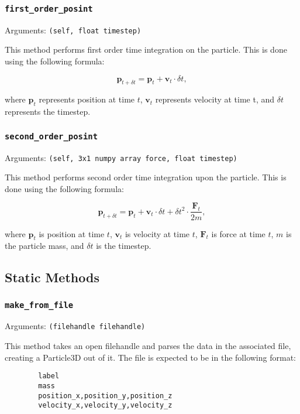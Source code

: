 \documentclass[a4paper, 11pt, british, left=1in, right=1in, top=0.3in, bottom=1in]{article}
\begin{document}
	\subsubsection{\texttt{first\_order\_posint}}
	
	Arguments: \texttt{(self, float timestep)}
	
	This method performs first order time integration on the particle. This is done using the following formula:
	
	$$\textbf{p}_{t+\delta t} = \textbf{p}_t + \textbf{v}_t \cdot \delta t, $$
	
	where $\textbf{p}_t$ represents position at time $t$, $\textbf{v}_t$ represents velocity at time t, and $\delta t$ represents the timestep. 
	
	\subsubsection{\texttt{second\_order\_posint}}
	
	Arguments: \texttt{(self, 3x1 numpy array force, float timestep)}
	
	This method performs second order time integration upon the particle. This is done using the following formula: 
	
	$$\textbf{p}_{t+\delta t} = \textbf{p}_t + \textbf{v}_t\cdot\delta t + \delta t^2 \cdot \frac{\textbf{F}_t}{2m},$$
	
	where $\textbf{p}_t$ is position at time $t$, $\textbf{v}_t$ is velocity at time $t$, $\textbf{F}_t$ is force at time $t$, $m$ is the particle mass, and $\delta t$ is the timestep. 

	\subsection{Static Methods}
	
	\subsubsection{\texttt{make\_from\_file}}
	
	Arguments: \texttt{(filehandle filehandle)}
	
	This method takes an open filehandle and parses the data in the associated file, creating a Particle3D out of it. The file is expected to be in the following format:
	
	\begin{verbatim}
		label
		mass
		position_x,position_y,position_z
		velocity_x,velocity_y,velocity_z
	\end{verbatim}
	
\end{document}

